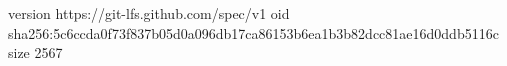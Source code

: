 version https://git-lfs.github.com/spec/v1
oid sha256:5c6ccda0f73f837b05d0a096db17ca86153b6ea1b3b82dcc81ae16d0ddb5116c
size 2567
